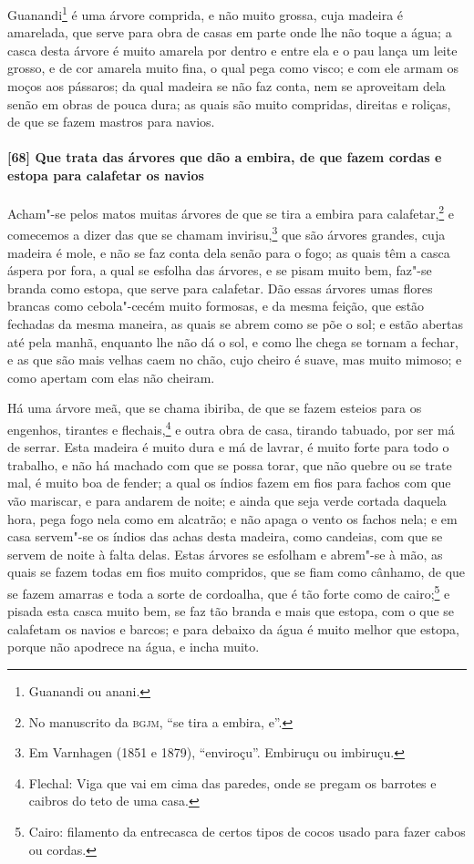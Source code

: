 \begin{linenumbers}
Guanandi\footnote{ Guanandi ou anani.} é uma árvore comprida, e não muito grossa, cuja
madeira é amarelada, que serve para obra de casas em parte onde lhe não toque a água; a
casca desta árvore é muito amarela por dentro e entre ela e o pau lança um leite grosso, e
de cor amarela muito fina, o qual pega como visco; e com ele armam os moços aos pássaros;
da qual madeira se não faz conta, nem se aproveitam dela senão em obras de pouca dura; as
quais são muito compridas, direitas e roliças, de que se fazem mastros para navios.

\paragraph{[68] Que trata das árvores que dão a embira, de que fazem cordas e estopa para
calafetar os navios}\quad
Acham"-se pelos matos muitas árvores de que se tira a embira para calafetar,\footnote{ No
manuscrito da \textsc{bgjm}, ``se tira a embira, e''.} e comecemos a dizer das que se
chamam invirisu,\footnote{ Em Varnhagen (1851 e 1879), ``enviroçu''. Embiruçu ou
imbiruçu.} que são árvores grandes, cuja madeira é mole, e não se faz conta dela senão
para o fogo; as quais têm a casca áspera por fora, a qual se esfolha das árvores, e se
pisam muito bem, faz"-se branda como estopa, que serve para calafetar. Dão essas árvores
umas flores brancas como cebola"-cecém muito formosas, e da mesma feição, que estão
fechadas da mesma maneira, as quais se abrem como se põe o sol; e estão abertas até pela
manhã, enquanto lhe não dá o sol, e como lhe chega se tornam a fechar, e as que são mais
velhas caem no chão, cujo cheiro é suave, mas muito mimoso; e como apertam com elas não
cheiram.

Há uma árvore meã, que se chama ibiriba, de que se fazem esteios para os engenhos,
tirantes e flechais,\footnote{ Flechal: Viga que vai em cima das paredes, onde se pregam
os barrotes e caibros do teto de uma casa.} e outra obra de casa, tirando tabuado, por ser
má de serrar. Esta madeira é muito dura e má de lavrar, é muito forte para todo o
trabalho, e não há machado com que se possa torar, que não quebre ou se trate mal, é muito
boa de fender; a qual os índios fazem em fios para fachos com que vão mariscar, e para
andarem de noite; e ainda que seja verde cortada daquela hora, pega fogo nela como em
alcatrão; e não apaga o vento os fachos nela; e em casa servem"-se os índios das achas
desta madeira, como candeias, com que se servem de noite à falta delas. Estas árvores se
esfolham e abrem"-se à mão, as quais se fazem todas em fios muito compridos, que se fiam
como cânhamo, de que se fazem amarras e toda a sorte de cordoalha, que é tão forte como de
cairo;\footnote{ Cairo: filamento da entrecasca de certos tipos de cocos usado para fazer
cabos ou cordas.} e pisada esta casca muito bem, se faz tão branda e mais que estopa, com
o que se calafetam os navios e barcos; e para debaixo da água é muito melhor que estopa,
porque não apodrece na água, e incha muito.


\end{linenumbers}
